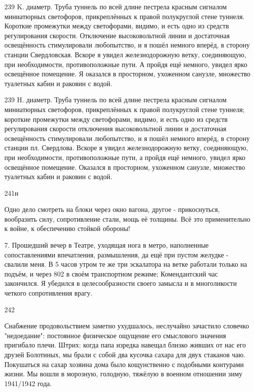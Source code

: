 239 K. диаметр. Труба туннель по всей длине пестрела красным сигналом миниатюрных светофоров, прикреплённых к правой полукруглой стене туннеля. Короткие промежутки между светофорами, видимо, и есть одно из средств регулирования скорости. Отключение высоковольтной линии и достаточная освещённость стимулировали любопытство, и я пошёл немного вперёд, в сторону станции Свердловская. Вскоре я увидел железнодорожную ветку, соединяющую, при необходимости, противоположные пути. А пройдя ещё немного, увидел ярко освещённое помещение. Я оказался в просторном, ухоженном санузле, множество туалетных кабин и раковин с водой.

239 H. диаметр. Труба туннель по всей длине пестрела красным сигналом миниатюрных светофоров, прикреплённых к правой полукруглой стене туннеля; короткие промежутки между светофорами, видимо, и есть одно из средств регулирования скорости отключения высоковольтной линии и достаточная освещённость стимулировали любопытство, и я пошёл немного вперёд, в сторону станции пл. Свердлова. Вскоре я увидел железнодорожную ветку, соединяющую, при необходимости, противоположные пути, а пройдя ещё немного, увидел ярко освещённое помещение. Оказался в просторном, ухоженном санузле, множество туалетных кабин и раковин с водой.

241н

Одно дело смотреть на блоки через окно вагона, другое - прикоснуться, вообразить силу, сопротивление стали, мощь её толщины. Всё это применительно к войне, к обеспечению стойкой обороны!

7. Прошедший вечер в Театре, уходящая нога в метро, наполненные сопоставлениями впечатления, размышления, да ещё при пустом желудке - свалили меня. В 5 часов утром те же три эскалатора на ветке работали только на подъём, и через 802 в своём транспортном режиме; Комендантский час закончился. Я убедился в целесообразности своего замысла и в многоликости четкого сопротивления врагу.

242

Снабжение продовольствием заметно ухудшалось, неслучайно зачастило словечко "недоедание": постоянное физическое ощущение его смыслового значения пригибало плечи. Штрих: когда папа изредка навещал близко живших от нас его друзей Болотиных, мы брали с собой два кусочка сахара для двух стаканов чаю. Покушаться на сахар хозяина дома было кощунственно с подобными контурами жизни. Мы вошли в морозную, голодную, тяжёлую в военном отношении зиму 1941/1942 года.

